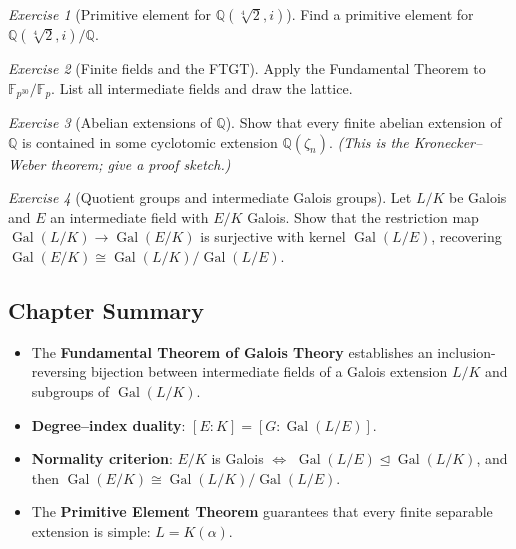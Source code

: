 \documentclass[12pt,a4paper,openany]{book}
\theoremstyle{definition}
\theoremstyle{remark}
\newtheorem{exercise}{Exercise}[chapter]
\newcommand{\Q}{\mathbb{Q}}
\newcommand{\F}{\mathbb{F}}
\DeclareMathOperator{\Gal}{Gal}
\begin{document}
\begin{exercise}[{Primitive element for $\Q(\sqrt[4]{2},i)$}]\label{exo:primitive-x4}
Find a primitive element for $\Q(\sqrt[4]{2},i)/\Q$.
\end{exercise}

\begin{exercise}[Finite fields and the FTGT]\label{exo:ftgt-finite}
Apply the Fundamental Theorem to $\F_{p^{30}}/\F_{p}$.  List all
intermediate fields and draw the lattice.
\end{exercise}

\begin{exercise}[Abelian extensions of $\Q$]\label{exo:abelian-ext}
Show that every finite abelian extension of $\Q$ is contained in some
cyclotomic extension $\Q(\zeta_{n})$.
\textit{(This is the Kronecker--Weber theorem; give a proof sketch.)}
\end{exercise}

\begin{exercise}[Quotient groups and intermediate Galois groups]
\label{exo:quotient-gal}
Let $L/K$ be Galois and $E$ an intermediate field with $E/K$ Galois.
Show that the restriction map $\Gal(L/K)\to\Gal(E/K)$ is surjective with
kernel $\Gal(L/E)$, recovering $\Gal(E/K)\cong\Gal(L/K)/\Gal(L/E)$.
\end{exercise}

\subsection*{Chapter Summary}

\begin{itemize}
\item The \textbf{Fundamental Theorem of Galois Theory} establishes an
inclusion-reversing bijection between intermediate fields of a Galois
extension $L/K$ and subgroups of $\Gal(L/K)$.
\item \textbf{Degree--index duality}: $[E:K]=[G:\Gal(L/E)]$.
\item \textbf{Normality criterion}: $E/K$ is Galois $\Leftrightarrow$
$\Gal(L/E)\trianglelefteq\Gal(L/K)$, and then
$\Gal(E/K)\cong\Gal(L/K)/\Gal(L/E)$.
\item The \textbf{Primitive Element Theorem} guarantees that every finite
separable extension is simple: $L=K(\alpha)$.
\end{itemize}


\end{document}
